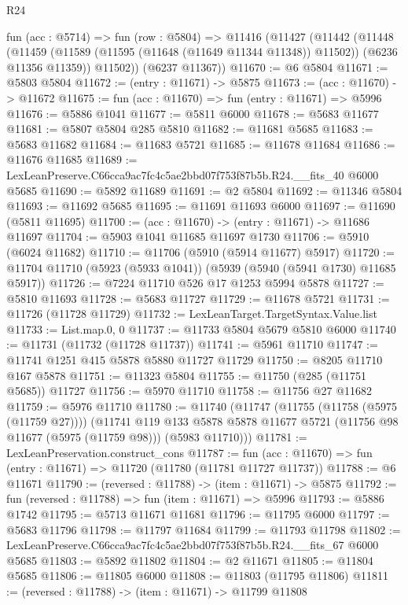 \begin{lexlean}{R24}
\begin{coremodule}
  fun (acc : @5714) =>
  fun (row : @5804) =>
  @11416
    (@11427
      (@11442
        (@11448
          (@11459 (@11589 (@11595 (@11648 (@11649 @11344 @11348)) @11502)) (@6236 @11356 @11359))
          @11502))
      (@6237 @11367))
@11670 := @6 @5804
@11671 := @5803 @5804
@11672 := (entry : @11671) -> @5875
@11673 := (acc : @11670) -> @11672
@11675 := fun (acc : @11670) => fun (entry : @11671) => @5996
@11676 := @5886 @1041
@11677 := @5811 @6000
@11678 := @5683 @11677
@11681 := @5807 @5804 @285 @5810
@11682 := @11681 @5685
@11683 := @5683 @11682
@11684 := @11683 @5721
@11685 := @11678 @11684
@11686 := @11676 @11685
@11689 := LexLeanPreserve.C66cca9ac7fc4c5ae2bbd07f753f87b5b.R24.__fits_40 @6000 @5685
@11690 := @5892 @11689
@11691 := @2 @5804
@11692 := @11346 @5804
@11693 := @11692 @5685
@11695 := @11691 @11693 @6000
@11697 := @11690 (@5811 @11695)
@11700 := (acc : @11670) -> (entry : @11671) -> @11686 @11697
@11704 := @5903 @1041 @11685 @11697 @1730
@11706 := @5910 (@6024 @11682)
@11710 := @11706 (@5910 (@5914 @11677) @5917)
@11720 := @11704 @11710 (@5923 (@5933 @1041)) (@5939 (@5940 (@5941 @1730) @11685 @5917))
@11726 := @7224 @11710 @526 @17 @1253 @5994 @5878
@11727 := @5810 @11693
@11728 := @5683 @11727
@11729 := @11678 @5721
@11731 := @11726 (@11728 @11729)
@11732 := LexLeanTarget.TargetSyntax.Value.list
@11733 := List.map.{0, 0}
@11737 := @11733 @5804 @5679 @5810 @6000
@11740 := @11731 (@11732 (@11728 @11737))
@11741 := @5961 @11710
@11747 := @11741 @1251 @415 @5878 @5880 @11727 @11729
@11750 := @8205 @11710 @167 @5878
@11751 := @11323 @5804
@11755 := @11750 (@285 (@11751 @5685)) @11727
@11756 := @5970 @11710
@11758 := @11756 @27 @11682
@11759 := @5976 @11710
@11780 := @11740
    (@11747
      (@11755 (@11758 (@5975 (@11759 @27))))
      (@11741
        @119
        @133
        @5878
        @5878
        @11677
        @5721
        (@11756 @98 @11677 (@5975 (@11759 @98)))
        (@5983 @11710)))
@11781 := LexLeanPreservation.construct_cons
@11787 := fun (acc : @11670) => fun (entry : @11671) => @11720 (@11780 (@11781 @11727 @11737))
@11788 := @6 @11671
@11790 := (reversed : @11788) -> (item : @11671) -> @5875
@11792 := fun (reversed : @11788) => fun (item : @11671) => @5996
@11793 := @5886 @1742
@11795 := @5713 @11671 @11681
@11796 := @11795 @6000
@11797 := @5683 @11796
@11798 := @11797 @11684
@11799 := @11793 @11798
@11802 := LexLeanPreserve.C66cca9ac7fc4c5ae2bbd07f753f87b5b.R24.__fits_67 @6000 @5685
@11803 := @5892 @11802
@11804 := @2 @11671
@11805 := @11804 @5685
@11806 := @11805 @6000
@11808 := @11803 (@11795 @11806)
@11811 := (reversed : @11788) -> (item : @11671) -> @11799 @11808

\end{coremodule}
\end{lexlean}
